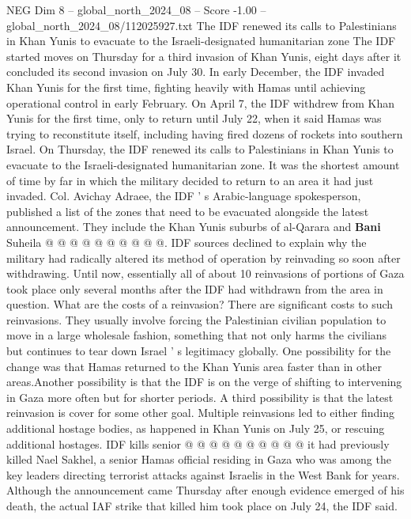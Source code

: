 \begin{textsample}{NEG Dim 8 – global\_north\_2024\_08 – Score -1.00 – global\_north\_2024\_08/112025927.txt}  \label{ex:f8_neg_419}
The IDF renewed its calls to Palestinians in Khan Yunis to evacuate to the Israeli-designated humanitarian zone The IDF started moves on Thursday for a third invasion of Khan Yunis, eight days after it concluded its second invasion on July 30.
In early December, the IDF invaded Khan Yunis for the first time, fighting heavily with Hamas until achieving operational control in early February.
On April 7, the IDF withdrew from Khan Yunis for the first time, only to return until July 22, when it said Hamas was trying to reconstitute itself, including having fired dozens of rockets into southern Israel.
On Thursday, the IDF renewed its calls to Palestinians in Khan Yunis to evacuate to the Israeli-designated humanitarian zone.
It was the shortest amount of time by far in which the military decided to return to an area it had just invaded.
Col.
Avichay Adraee, the IDF ' s Arabic-language spokesperson, published a list of the zones that need to be evacuated alongside the latest announcement.
They include the Khan Yunis suburbs of al-Qarara and \textbf{Bani} Suheila @ @ @ @ @ @ @ @ @ @.
IDF sources declined to explain why the military had radically altered its method of operation by reinvading so soon after withdrawing.
Until now, essentially all of about 10 reinvasions of portions of Gaza took place only several months after the IDF had withdrawn from the area in question.
What are the costs of a reinvasion?
There are significant costs to such reinvasions.
They usually involve forcing the Palestinian civilian population to move in a large wholesale fashion, something that not only harms the civilians but continues to tear down Israel ' s legitimacy globally.
One possibility for the change was that Hamas returned to the Khan Yunis area faster than in other areas.Another possibility is that the IDF is on the verge of shifting to intervening in Gaza more often but for shorter periods.
A third possibility is that the latest reinvasion is cover for some other goal.
Multiple reinvasions led to either finding additional hostage bodies, as happened in Khan Yunis on July 25, or rescuing additional hostages.
IDF kills senior @ @ @ @ @ @ @ @ @ @ it had previously killed Nael Sakhel, a senior Hamas official residing in Gaza who was among the key leaders directing terrorist attacks against Israelis in the West Bank for years.
Although the announcement came Thursday after enough evidence emerged of his death, the actual IAF strike that killed him took place on July 24, the IDF said.

\end{textsample}
